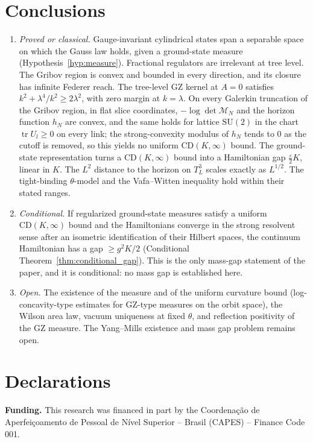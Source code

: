 \documentclass[11pt,a4paper]{amsart}
\theoremstyle{definition}
\begin{document}
\section{Conclusions}
\begin{enumerate}
    \item \emph{Proved or classical.} Gauge-invariant cylindrical states span a separable space on which the Gauss law holds, given a ground-state measure (Hypothesis~\ref{hyp:measure}). Fractional regulators are irrelevant at tree level. The Gribov region is convex and bounded in every direction, and its closure has infinite Federer reach. The tree-level GZ kernel at $A=0$ satisfies $k^2 + \lambda^4/k^2 \ge 2\lambda^2$, with zero margin at $k = \lambda$. On every Galerkin truncation of the Gribov region, in flat slice coordinates, $-\log\det\mathcal{M}_N$ and the horizon function $h_N$ are convex, and the same holds for lattice $\mathrm{SU}(2)$ in the chart $\operatorname{tr}U_l \ge 0$ on every link; the strong-convexity modulus of $h_N$ tends to $0$ as the cutoff is removed, so this yields no uniform $\mathrm{CD}(K,\infty)$ bound. The ground-state representation turns a $\mathrm{CD}(K,\infty)$ bound into a Hamiltonian gap $\frac{\varepsilon}{2}K$, linear in $K$. The $L^2$ distance to the horizon on $T^3_L$ scales exactly as $L^{1/2}$. The tight-binding $\theta$-model and the Vafa--Witten inequality hold within their stated ranges.
    \item \emph{Conditional.} If regularized ground-state measures satisfy a uniform $\mathrm{CD}(K,\infty)$ bound and the Hamiltonians converge in the strong resolvent sense after an isometric identification of their Hilbert spaces, the continuum Hamiltonian has a gap $\ge g^2K/2$ (Conditional Theorem~\ref{thm:conditional_gap}). This is the only mass-gap statement of the paper, and it is conditional: no mass gap is established here.
    \item \emph{Open.} The existence of the measure and of the uniform curvature bound (log-concavity-type estimates for GZ-type measures on the orbit space), the Wilson area law, vacuum uniqueness at fixed $\theta$, and reflection positivity of the GZ measure. The Yang--Mills existence and mass gap problem remains open.
\end{enumerate}

\section*{Declarations}

\noindent\textbf{Funding.} This research was financed in part by the Coordena\c{c}\~ao de Aperfei\c{c}oamento de Pessoal de N\'ivel Superior -- Brasil (CAPES) -- Finance Code 001.
\end{document}
